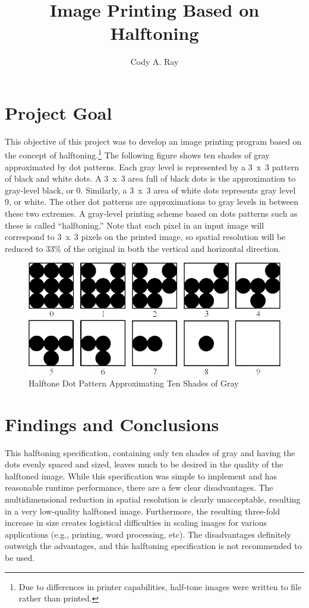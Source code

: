 \documentclass[11pt]{article}
\title{Image Printing Based on Halftoning}
\author{Cody A. Ray}
\begin{document}
\maketitle

\section{Project Goal}

This objective of this project was to develop an image printing program based on the concept of halftoning.\footnote{Due to differences in printer capabilities, half-tone images were written to file rather than printed.} The following figure shows ten shades of gray approximated by dot patterns.  Each gray level is represented by a 3~x~3 pattern of black and white dots.  A 3~x~3 area full of black dots is the approximation to gray-level black, or 0.  Similarly, a 3~x~3 area of white dots represents gray level 9, or white.  The other dot patterns are approximations to gray levels in between these two extremes.  A gray-level printing scheme based on dots patterns such as these is called  ``halftoning.''  Note that each pixel in an input image will correspond to 3~x~3 pixels on the printed image, so spatial resolution will be reduced to 33\% of the original in both the vertical and horizontal direction. 

\begin{figure}[ht]
   \centering
   \includegraphics{halftone-dots.png}
   \caption{Halftone Dot Pattern Approximating Ten Shades of Gray}
   \label{fig:halftone-dots}
\end{figure}

\section{Findings and Conclusions}

This halftoning specification, containing only ten shades of gray and having the dots evenly spaced and sized, leaves much to be desired in the quality of the halftoned image. While this specification was simple to implement and has reasonable runtime performance,  there are a few clear disadvantages. The multidimensional reduction in spatial resolution is clearly unacceptable, resulting in a very low-quality halftoned image. Furthermore, the resulting three-fold increase in size creates logistical difficulties in scaling images for various applications (e.g., printing, word processing, etc). The disadvantages definitely outweigh the advantages, and this halftoning specification is not recommended to be used.
\end{document}
